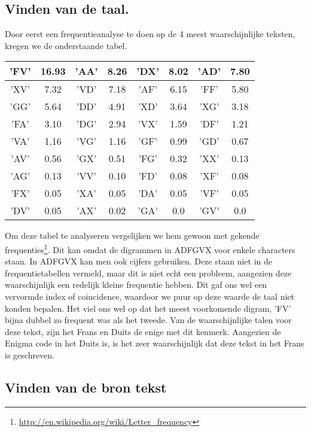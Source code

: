 \subsection{Vinden van de taal.}
Door eerst een frequentieanalyse te doen op de 4 meest waarschijnlijke teksten, kregen we de onderstaande tabel.
\begin{center}
\begin{tabular}{|c|c|c|c|c|c|c|c|}
\hline
'FV'& 16.93 &
'AA'& 8.26 &
'DX'& 8.02 &
'AD'& 7.80\\ \hline
'XV'& 7.32 &
'VD'& 7.18 &
'AF'& 6.15 &
'FF'& 5.80\\ \hline
'GG'& 5.64 &
'DD'& 4.91 &
'XD'& 3.64 &
'XG'& 3.18\\ \hline
'FA'& 3.10 &
'DG'& 2.94 &
'VX'& 1.59 &
'DF'& 1.21\\ \hline
'VA'& 1.16 &
'VG'& 1.16 &
'GF'& 0.99 &
'GD'& 0.67\\ \hline
'AV'& 0.56 &
'GX'& 0.51 &
'FG'& 0.32 &
'XX'& 0.13\\ \hline
'AG'& 0.13 &
'VV'& 0.10 &
'FD'& 0.08 &
'XF'& 0.08\\ \hline
'FX'& 0.05 &
'XA'& 0.05 &
'DA'& 0.05 &
'VF'& 0.05\\ \hline
'DV'& 0.05 &
'AX'& 0.02 &
'GA'& 0.0 &
'GV'& 0.0\\ \hline
\end{tabular}

\end{center}

Om deze tabel te analyseren vergelijken we hem gewoon met gekende frequenties\footnote{\url{http://en.wikipedia.org/wiki/Letter_frequency}}. Dit kan omdat de digrammen in ADFGVX voor enkele characters staan. In ADFGVX kan men ook cijfers gebruiken. Deze staan niet in de frequentietabellen vermeld, maar dit is niet echt een probleem, aangezien deze waarschijnlijk een redelijk kleine frequentie hebben. Dit gaf ons wel een vervormde index of coincidence, waardoor we puur op deze waarde de taal niet konden bepalen. Het viel ons wel op dat het meest voorkomende digram, 'FV' bijna dubbel zo frequent was als het tweede. Van de waarschijnlijke talen voor deze tekst, zijn het Frans en Duits de enige met dit kenmerk. Aangezien de Enigma code in het Duits is, is het zeer waarschijnlijk dat deze tekst in het Frans is geschreven.

\subsection{Vinden van de bron tekst}


